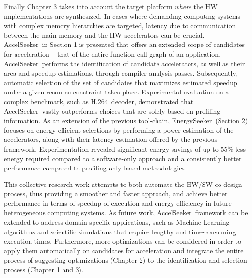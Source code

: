 \documentclass[]{usiinfthesis}
\newcommand{\aseeker}{{AccelSeeker}}
\newcommand{\eseeker}{{EnergySeeker}}
\newcommand{\htsf}{{H.264}}
\begin{document}
Finally Chapter 3 takes into account the target platform {\em where} the HW implementations are synthesized. In cases where demanding computing systems with complex memory hierarchies are 
targeted, latency due to communication between the main memory and the HW accelerators
can be crucial. \aseeker\ in Section 1 is presented that offers an extended scope of candidates for acceleration -- that of the entire function call graph of an application.
\aseeker\ performs the identification of candidate accelerators, as well as their area and speedup estimations, through compiler analysis passes. Subsequently, automatic selection of the set of candidates that maximizes estimated speedup under a given resource constraint takes place. Experimental evaluation on a complex benchmark, such as \htsf\ decoder, demonstrated that 
\aseeker\ vastly outperforms choices that are solely based on profiling information.
As an extension of the previous tool-chain, \eseeker\ (Section 2) focuses on energy efficient selections by performing a power estimation of the accelerators, along with their latency estimation offered by the previous framework. Experimentation revealed significant energy savings of up to 55\% less energy required compared to a software-only approach and a consistently better performance compared to profiling-only based methodologies.\par

This collective research work attempts to both automate the HW/SW co-design process, thus providing a smoother and faster approach, and achieve better performance in terms of speedup of execution and energy efficiency in future heterogeneous computing systems. As future work, 
\aseeker\ framework can be extended to address domain specific applications, such as Machine
Learning algorithms and scientific  simulations that require lengthy and time-consuming
execution times. Furthermore, more optimizations can be considered in order to apply them 
automatically on candidates for acceleration and integrate the entire process of suggesting optimizations (Chapter 2) to the identification and selection process (Chapter 1 and 3).
\end{document}
